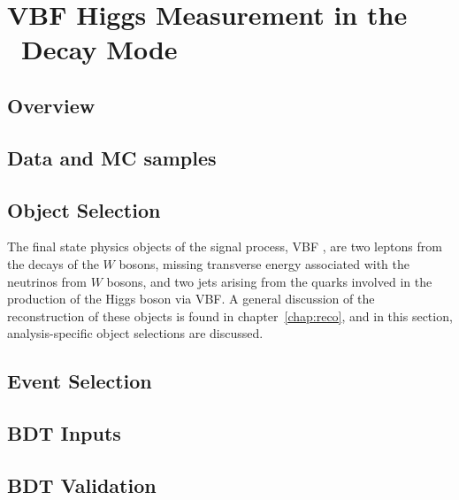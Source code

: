 \chapter{VBF Higgs Measurement in the \wwlnln~Decay Mode}
\label{chap:analysis}


\section{Overview}
%

\section{Data and MC samples}
\label{chap:analysis:sec:data_mc}
%

\section{Object Selection}
\label{chap:analysis:sec:objects}

The final state physics objects of the signal process, VBF \hwwlnln, are
two leptons from the decays of the $W$ bosons, missing transverse
energy associated with the neutrinos from $W$ bosons, and two
jets arising from the quarks involved in the production of the Higgs
boson via VBF. A general discussion of the reconstruction of these
objects is found in chapter~\ref{chap:reco}, and in this section,
analysis-specific object selections are discussed. 

%

\section{Event Selection}
\label{chap:analysis:sec:event_selection}
%

\section{BDT Inputs}
\label{chap:analysis:sec:bdt_inputs}
%

\section{BDT Validation}
\label{chap:analysis:sec:bdt_validation}
%


